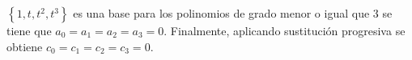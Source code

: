 \begin{frame}
\begin{solution}
\begin{math}
            \left\{
            1,
            t,
            t^{2},
            t^{3}
            \right\}
        \end{math}
        es una base para los polinomios de grado menor o igual que
        $3$ se tiene que
        \begin{math}
            a_{0}=
            a_{1}=
            a_{2}=
            a_{3}=
            0
        \end{math}.
        Finalmente, aplicando sustitución progresiva se obtiene
        \begin{math}
            c_{0}=
            c_{1}=
            c_{2}=
            c_{3}=
            0
        \end{math}.
    \end{solution}
\end{frame}